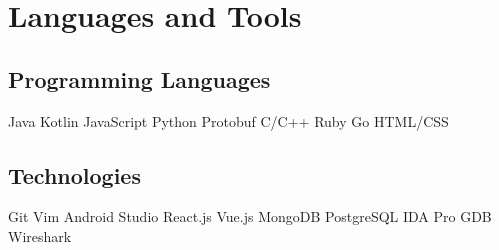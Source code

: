 \documentclass[]{template}
\begin{document}
\section{Languages and Tools}
\begin{minipage}[t]{.45\textwidth}
\subsection{Programming Languages}
Java
\textbullet{} Kotlin
\textbullet{} JavaScript
\textbullet{} Python
\textbullet{} Protobuf
\textbullet{} C/C++
\textbullet{} Ruby
\textbullet{} Go
\textbullet{} HTML/CSS
\sectionsep
\end{minipage}
\hfill
\begin{minipage}[t]{.45\textwidth}
\subsection{Technologies}
Git
\textbullet{} Vim
\textbullet{} Android Studio
\textbullet{} React.js
\textbullet{} Vue.js
\textbullet{} MongoDB
\textbullet{} PostgreSQL
\textbullet{} IDA  Pro
\textbullet{} GDB
\textbullet{} Wireshark
\end{minipage}
\end{document}
